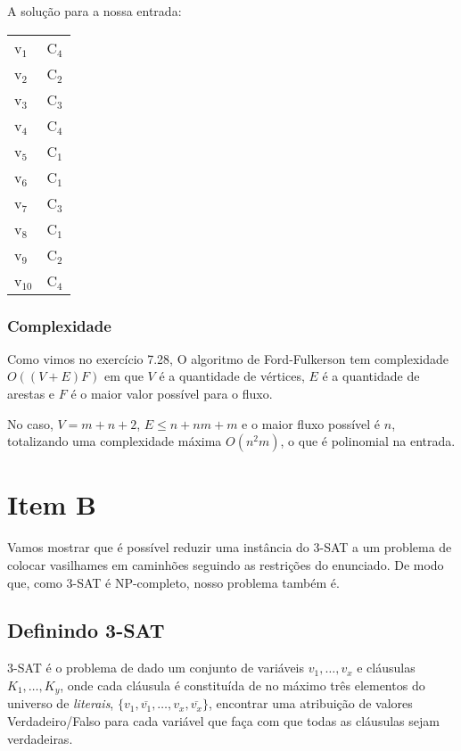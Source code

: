 \documentclass[11pt]{article}
\begin{document}
A solução para a nossa entrada:
\begin{center}
\begin{tabular}{ll}
v$_{\text{1}}$ & C$_{\text{4}}$\\
v$_{\text{2}}$ & C$_{\text{2}}$\\
v$_{\text{3}}$ & C$_{\text{3}}$\\
v$_{\text{4}}$ & C$_{\text{4}}$\\
v$_{\text{5}}$ & C$_{\text{1}}$\\
v$_{\text{6}}$ & C$_{\text{1}}$\\
v$_{\text{7}}$ & C$_{\text{3}}$\\
v$_{\text{8}}$ & C$_{\text{1}}$\\
v$_{\text{9}}$ & C$_{\text{2}}$\\
v$_{\text{10}}$ & C$_{\text{4}}$\\
\end{tabular}
\end{center}

\subsubsection{Complexidade}
\label{sec-2-1-2}

Como vimos no exercício 7.28, O algoritmo de Ford-Fulkerson tem
complexidade $O((V + E)F)$ em que $V$ é a quantidade de vértices, $E$
é a quantidade de arestas e $F$ é o maior valor possível para o fluxo.

No caso, $V = m + n + 2$, $E \leq n + nm + m$ e o maior fluxo possível é
$n$, totalizando uma complexidade máxima $O(n^2m)$, o que é polinomial na
entrada.

\section{Item B}
\label{sec-3}

Vamos mostrar que é possível reduzir uma instância do 3-SAT a um
problema de colocar vasilhames em caminhões seguindo as restrições do
enunciado. De modo que, como 3-SAT é NP-completo, nosso problema
também é.

\subsection{Definindo 3-SAT}
\label{sec-3-1}

3-SAT é o problema de dado um conjunto de variáveis $v_1, \ldots, v_x$
e cláusulas $K_1, \ldots, K_y$, onde cada cláusula é constituída de no
máximo três elementos do universo de \textit{literais}, $\{v_1,
\overline{v_1}, \ldots, v_x, \overline{v_x}\}$, encontrar uma
atribuição de valores Verdadeiro/Falso para cada variável
que faça com que todas as cláusulas sejam verdadeiras.
\end{document}
